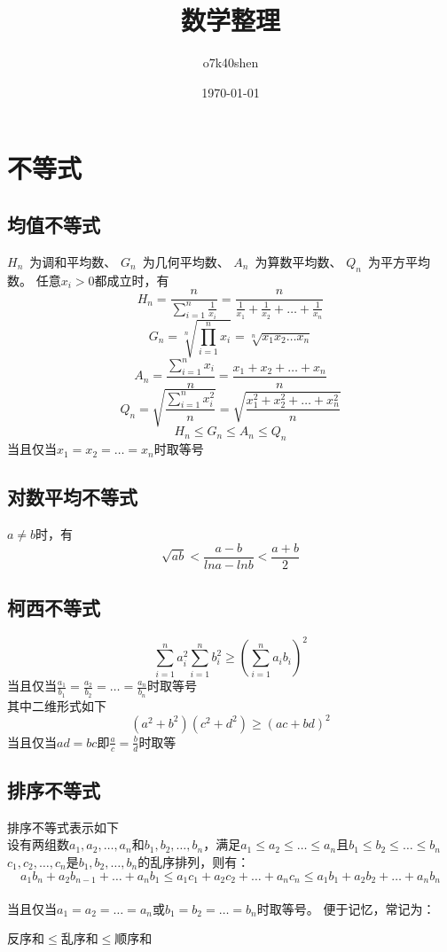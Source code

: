 \documentclass[UTF8]{ctexart}
\title{数学整理}
\author{o7k40shen}
\date{\today}
\begin{document}
	\maketitle
	\tableofcontents
	\newpage
	\section{不等式}
		\subsection{均值不等式}
			$H_n$\  为调和平均数、
			$G_n$\	为几何平均数、
			$A_n$\	为算数平均数、
			$Q_n$\	为平方平均数。
			任意$x_i> 0$都成立时，有
			\[H_n=\frac{n}{\sum\limits_{i=1}^n\frac{1}{x_i}}=\frac{n}{\frac{1}{x_1}+\frac{1}{x_2}+\dots+\frac{1}{x_n}}\] 
			\[G_n=\sqrt[n]{\prod_{i=1}^{n}x_i}=\sqrt[n]{x_1 x_2 \dots x_n}\]
			\[A_n=\frac{\sum\limits_{i=1}^{n}x_i}{n}=\frac{x_1+x_2+\dots+x_n}{n}\]
			\[Q_n=\sqrt{\frac{\sum\limits_{i=1}^{n}x_i^{2}}{n}}=\sqrt{\frac{x_1^{2}+x_2^{2}+\dots+x_n^{2}}{n}}\]
			\[H_n\leq G_n\leq A_n\leq Q_n\]
			当且仅当$x_1=x_2=\dots =x_n$时取等号
		\subsection{对数平均不等式}
			$a\neq b$时，有
			\[\sqrt{ab}<\frac{a-b}{lna-lnb}<\frac{a+b}{2}\]
		\subsection{柯西不等式}
			\[\sum\limits_{i=1}^{n}a_i^{2}\sum\limits_{i=1}^{n}b_i^{2}\geq (\sum\limits_{i=1}^{n}a_i b_i)^2\]
			当且仅当$\frac{a_1}{b_1}=\frac{a_2}{b_2}=\dots =\frac{a_n}{b_n}$时取等号\\
			其中二维形式如下
			\[(a^2+b^2)(c^2+d^2)\geq (ac+bd)^2\]
			当且仅当$ad=bc$即$\frac{a}{c}=\frac{b}{d}$时取等
		\subsection{排序不等式}
			排序不等式表示如下\\
			设有两组数$a_1,a_2,\dots,a_n$和$b_1,b_2,\dots,b_n$，满足$a_1\leq a_2\leq \dots \leq a_n$且$b_1\leq b_2\leq \dots \leq b_n$
			$c_1,c_2,\dots,c_n$是$b_1,b_2,\dots,b_n$的乱序排列，则有：
			\\
			\[a_1 b_n+a_2 b_{n-1}+\dots+a_n b_1\leq a_1 c_1+a_2 c_2+\dots+a_n c_n\leq a_1 b_1+a_2 b_2+\dots+a_n b_n\]
			\\
			当且仅当$a_1=a_2=\dots=a_n$或$b_1=b_2=\dots=b_n$时取等号。
			便于记忆，常记为：
			\begin{center}
				反序和$\leq$乱序和$\leq$顺序和
			\end{center}
\end{document}
